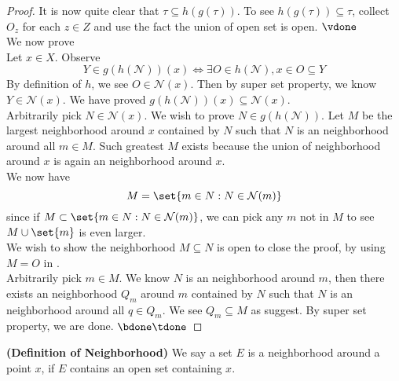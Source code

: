 \documentclass{report}
\begin{document}
\begin{proof}
It is now quite clear that $\tau \subseteq h(g(\tau))$. To see $h(g(\tau))\subseteq \tau$, collect $O_z$ for each  $z\in Z$ and use the fact the union of open set is open. $\vdone$\\

We now prove \\

Let $x\in X$. Observe
\begin{equation*}
Y \in g(h(\mathcal{N}))(x)\iff  \exists O \in h(\mathcal{N}),x \in O \subseteq Y
\label{1}
\end{equation*}
By definition of $h$, we see $O\in \mathcal{N}(x)$. Then by super set property, we know $Y \in \mathcal{N}(x)$. We have proved $ g(h(\mathcal{N}))(x)\subseteq \mathcal{N}(x)$.\\

Arbitrarily pick $N\in \mathcal{N}(x)$. We wish to prove $N\in g(h(\mathcal{N}))$. Let $M$ be the largest neighborhood around  $x$ contained by $N$ such that  $N$ is an neighborhood around all  $m \in M$. Such greatest $M$ exists because the union of neighborhood  around  $x$ is again an neighborhood around  $x$.\\

We now have 
\begin{equation*}
M=\set{m\in N:N\in \mathcal{N}(m)}
\label{2}
\end{equation*}
since if $M\subset \set{m \in N:N\in \mathcal{N}(m)}$, we can pick any $m$  not in $M$ to see  $M\cup \set{m}$ is even larger.\\

We wish to show the neighborhood $M\subseteq N$ is open to close the proof, by using $M=O$ in .\\

Arbitrarily pick $m \in M$. We know $N$ is an neighborhood around  $m$, then there exists an neighborhood $Q_m$ around $m$ contained by $N$ such that $N$ is an neighborhood around all  $q\in Q_m$. We see $Q_m\subseteq M$ as  suggest. By super set property, we are done. $\bdone \tdone$
\end{proof}
\begin{definition}
\label{2.1.6}
\textbf{(Definition of Neighborhood)} We say a set $E$ is a neighborhood around a point $x$, if  $E$ contains an  open set containing $x$.
\end{definition}
\end{document}
